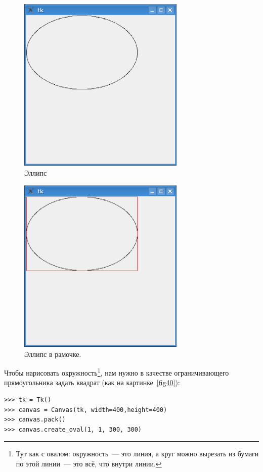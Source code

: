 \begin{figure}
\begin{center}
\includegraphics[width=80mm]{../en/figure38.eps}
\end{center}
\caption{Эллипс}\label{fig38}
\end{figure}

\begin{figure}
\begin{center}
\includegraphics[width=80mm]{../en/figure39.eps}
\end{center}
\caption{Эллипс в рамочке.}\label{fig39}
\end{figure}

Чтобы нарисовать окружность\footnote{Тут как с овалом: окружность — это линия, а круг можно вырезать из бумаги по этой линии — это всё, что внутри линии.}, нам нужно в качестве ограничивающего прямоугольника задать квадрат (как на картинке \ref{fig40}):

\begin{listing}
\begin{verbatim}
>>> tk = Tk()
>>> canvas = Canvas(tk, width=400,height=400)
>>> canvas.pack()
>>> canvas.create_oval(1, 1, 300, 300)
\end{verbatim}
\end{listing}


